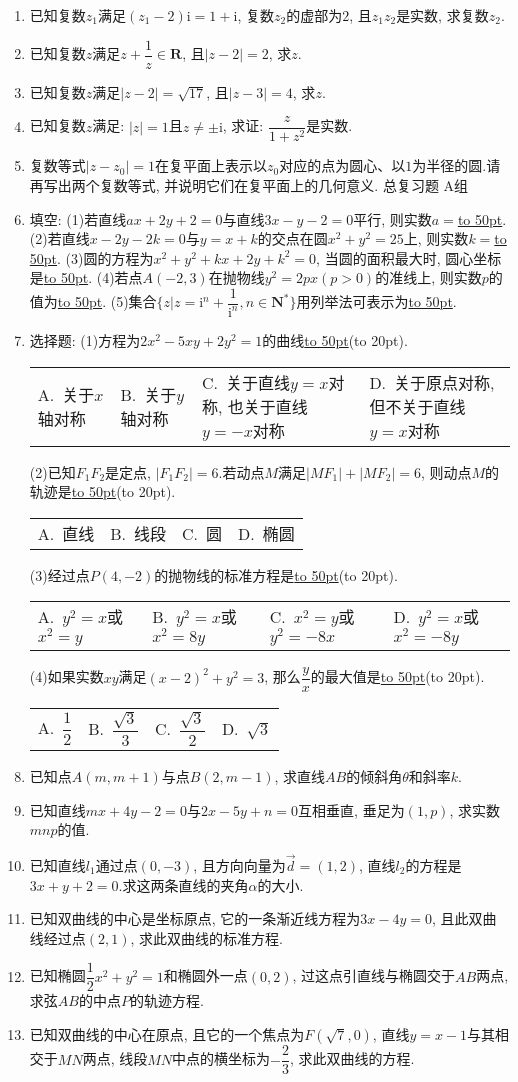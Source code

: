 \documentclass[10pt,a4paper]{article}
\newcommand{\blank}[1]{\underline{\hbox to #1pt{}}}
\newcommand{\bracket}[1]{(\hbox to #1pt{})}
\newcommand{\fourch}[4]{\par\begin{tabular}{p{.23\textwidth}p{.23\textwidth}p{.23\textwidth}p{.23\textwidth}}
A.~#1 &B.~#2& C.~#3& D.~#4
\end{tabular}}
\begin{document}
\begin{enumerate}[1.]
\item 已知复数$z_1$满足$(z_1-2)\mathrm{i}=1+\mathrm{i}$, 复数$z_2$的虚部为$2$, 且$z_1z_2$是实数, 求复数$z_2$.
\item 已知复数$z$满足$z+\dfrac 1z\in \mathbf{R}$, 且$|z-2|=2$, 求$z$.
\item 已知复数$z$满足$|z-2|=\sqrt {17}$, 且$|z-3|=4$, 求$z$.
\item 已知复数$z$满足: $|z|=1$且$z\ne \pm \mathrm{i}$, 求证: $\dfrac z{1+z^2}$是实数.
\item 复数等式$|z-z_0|=1$在复平面上表示以$z_0$对应的点为圆心、以$1$为半径的圆.请再写出两个复数等式, 并说明它们在复平面上的几何意义.
总复习题
A组
\item 填空:
(1)若直线$ax+2y+2=0$与直线$3x-y-2=0$平行, 则实数$a=$\blank{50}.
(2)若直线$x-2y-2k=0$与$y=x+k$的交点在圆$x^2+y^2=25$上, 则实数$k=$\blank{50}.
(3)圆的方程为$x^2+y^2+kx+2y+k^2=0$, 当圆的面积最大时, 圆心坐标是\blank{50}.
(4)若点$A(-2,3)$在抛物线$y^2=2px(p>0)$的准线上, 则实数$p$的值为\blank{50}.
(5)集合$\{z|z=\mathrm{i}^n+\dfrac 1{\mathrm{i}^n},n\in \mathbf{N}^*\}$用列举法可表示为\blank{50}.
\item 选择题:
(1)方程为$2x^2-5xy+2y^2=1$的曲线\blank{50}\bracket{20}.
\fourch{关于$x$轴对称}{关于$y$轴对称}{关于直线$y=x$对称, 也关于直线$y=-x$对称}{关于原点对称, 但不关于直线$y=x$对称}
(2)已知$F_1F_2$是定点, $|F_1F_2|=6$.若动点$M$满足$|MF_1|+|MF_2|=6$, 则动点$M$的轨迹是\blank{50}\bracket{20}.
\fourch{直线}{线段}{圆}{椭圆}
(3)经过点$P(4,-2)$的抛物线的标准方程是\blank{50}\bracket{20}.
\fourch{$y^2=x$或$x^2=y$}{$y^2=x$或$x^2=8y$}{$x^2=y$或$y^2=-8x$}{$y^2=x$或$x^2=-8y$}
(4)如果实数$xy$满足$(x-2)^2+y^2=3$, 那么$\dfrac yx$的最大值是\blank{50}\bracket{20}.
\fourch{$\dfrac 12$}{$\dfrac{\sqrt 3}3$}{$\dfrac{\sqrt 3}2$}{$\sqrt 3$}
\item 已知点$A(m,m+1)$与点$B(2,m-1)$, 求直线$AB$的倾斜角$\theta$和斜率$k$.
\item 已知直线$mx+4y-2=0$与$2x-5y+n=0$互相垂直, 垂足为$(1,p)$, 求实数$mnp$的值.
\item 已知直线$l_1$通过点$(0,-3)$, 且方向向量为$\overrightarrow d=(1,2)$, 直线$l_2$的方程是$3x+y+2=0$.求这两条直线的夹角$\alpha$的大小.
\item 已知双曲线的中心是坐标原点, 它的一条渐近线方程为$3x-4y=0$, 且此双曲线经过点$(2,1)$, 求此双曲线的标准方程.
\item 已知椭圆$\dfrac 12x^2+y^2=1$和椭圆外一点$(0,2)$, 过这点引直线与椭圆交于$AB$两点, 求弦$AB$的中点$P$的轨迹方程.
\item 已知双曲线的中心在原点, 且它的一个焦点为$F(\sqrt 7,0)$, 直线$y=x-1$与其相交于$MN$两点, 线段$MN$中点的横坐标为$-\dfrac 23$, 求此双曲线的方程.

\end{enumerate}
\end{document}
